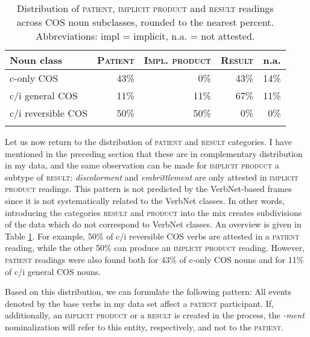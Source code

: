 \begin{table}[b]
  \centering 
  \caption[Distribution of \textsc{patient, implicit product} and \textsc{result} readings]{Distribution of \textsc{patient, implicit product} and \textsc{result} readings across COS noun subclasses, rounded to the nearest percent. Abbreviations: impl = implicit, n.a. = not attested.} 
  \label{tab:patprodres}
  \begin{tabular}{lrrrr}
    \lsptoprule 
    Noun class  & \multicolumn{1}{l}{\textsc{Patient}} & \multicolumn{1}{l}{\textsc{Impl. product}} & \multicolumn{1}{l}{\textsc{Result}} & \multicolumn{1}{l}{n.a.} \\
    \midrule
    c-only COS             & 43\%    & 0\%    & 43\%      & 14\%         \\
    c/i general COS              & 11\%    & 11\%    & 67\%      & 11\%         \\
    c/i reversible COS               & 50\%    & 50\%    & 0\%       & 0\%          \\
    \lspbottomrule    
  \end{tabular}
\end{table}

Let us now return to the distribution of \textsc{patient} and \textsc{result} categories. I have mentioned in the preceding section that these are in complementary distribution in my data, and the same observation can be made for \textsc{implicit product}  \textendash{}  a subtype of \textsc{result}: \textit{discolorment} and \textit{embrittlement} are only attested in \textsc{implicit product} readings. 
This pattern is not predicted by the VerbNet-based frames since it is not systematically related to the VerbNet classes. In other words, introducing the categories \textsc{result} and \textsc{product} into the mix creates subdivisions of the data which do not correspond to VerbNet classes. 
An overview is given in Table \ref{tab:patprodres}. 
For example, 50\% of c/i reversible COS verbs are attested in a \textsc{patient} reading, while the other 50\% can produce an \textsc{implicit product} reading. However, \textsc{patient} readings were also found both for 43\% of c-only COS nouns and for 11\% of c/i general COS nouns.

Based on this distribution, we can formulate the following pattern: All events denoted by the base verbs in my data set affect a \textsc{patient} participant. If, additionally, an \textsc{implicit product} or a \textsc{result} is created in the process, the \textit{-ment} nominalization will refer to this entity, respectively, and not to the \textsc{patient}. 

